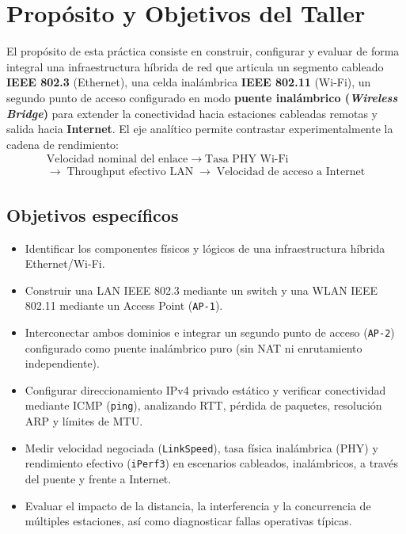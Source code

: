 \documentclass[11pt, a4paper]{article}
\begin{document}
\section{Propósito y Objetivos del Taller}

El propósito de esta práctica consiste en construir, configurar y evaluar de forma integral una infraestructura híbrida de red que articula un segmento cableado \textbf{IEEE 802.3} (Ethernet), una celda inalámbrica \textbf{IEEE 802.11} (Wi-Fi), un segundo punto de acceso configurado en modo \textbf{puente inalámbrico (\textit{Wireless Bridge})} para extender la conectividad hacia estaciones cableadas remotas y salida hacia \textbf{Internet}. El eje analítico permite contrastar experimentalmente la cadena de rendimiento:
\begin{gather*}
    \text{Velocidad nominal del enlace} \;\longrightarrow\; \text{Tasa PHY Wi-Fi} \\
    \longrightarrow\; \text{Throughput efectivo LAN} \;\longrightarrow\; \text{Velocidad de acceso a Internet}
\end{gather*}

\subsection*{Objetivos específicos}
\begin{itemize}
    \item Identificar los componentes físicos y lógicos de una infraestructura híbrida Ethernet/Wi-Fi.
    \item Construir una LAN IEEE 802.3 mediante un switch y una WLAN IEEE 802.11 mediante un Access Point (\texttt{AP-1}).
    \item Interconectar ambos dominios e integrar un segundo punto de acceso (\texttt{AP-2}) configurado como puente inalámbrico puro (sin NAT ni enrutamiento independiente).
    \item Configurar direccionamiento IPv4 privado estático y verificar conectividad mediante ICMP (\texttt{ping}), analizando RTT, pérdida de paquetes, resolución ARP y límites de MTU.
    \item Medir velocidad negociada (\texttt{LinkSpeed}), tasa física inalámbrica (PHY) y rendimiento efectivo (\texttt{iPerf3}) en escenarios cableados, inalámbricos, a través del puente y frente a Internet.
    \item Evaluar el impacto de la distancia, la interferencia y la concurrencia de múltiples estaciones, así como diagnosticar fallas operativas típicas.
\end{itemize}
\end{document}
